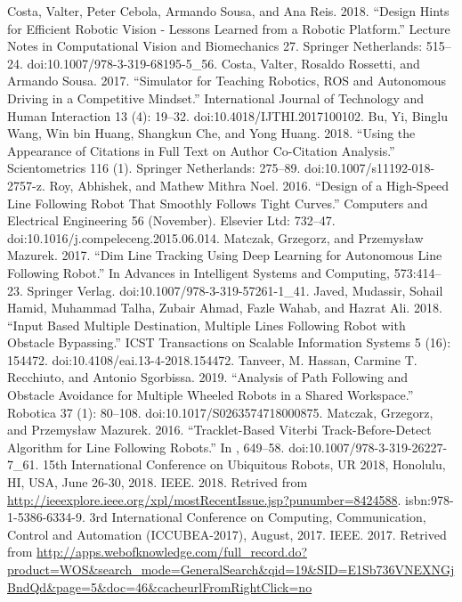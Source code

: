 \documentclass[conference]{IEEEtran}
\begin{document}
\begin{thebibliography}{00}
 Costa, Valter, Peter Cebola, Armando Sousa, and Ana Reis. 2018. “Design Hints for Efficient Robotic Vision - Lessons Learned from a Robotic Platform.” Lecture Notes in Computational Vision and Biomechanics 27. Springer Netherlands: 515–24. doi:10.1007/978-3-319-68195-5\_56.
 Costa, Valter, Rosaldo Rossetti, and Armando Sousa. 2017. “Simulator for Teaching Robotics, ROS and Autonomous Driving in a Competitive Mindset.” International Journal of Technology and Human Interaction 13 (4): 19–32. doi:10.4018/IJTHI.2017100102.
 Bu, Yi, Binglu Wang, Win bin Huang, Shangkun Che, and Yong Huang. 2018. “Using the Appearance of Citations in Full Text on Author Co-Citation Analysis.” Scientometrics 116 (1). Springer Netherlands: 275–89. doi:10.1007/s11192-018-2757-z.
 Roy, Abhishek, and Mathew Mithra Noel. 2016. “Design of a High-Speed Line Following Robot That Smoothly Follows Tight Curves.” Computers and Electrical Engineering 56 (November). Elsevier Ltd: 732–47. doi:10.1016/j.compeleceng.2015.06.014.
 Matczak, Grzegorz, and Przemysław Mazurek. 2017. “Dim Line Tracking Using Deep Learning for Autonomous Line Following Robot.” In Advances in Intelligent Systems and Computing, 573:414–23. Springer Verlag. doi:10.1007/978-3-319-57261-1\_41.
 Javed, Mudassir, Sohail Hamid, Muhammad Talha, Zubair Ahmad, Fazle Wahab, and Hazrat Ali. 2018. “Input Based Multiple Destination, Multiple Lines Following Robot with Obstacle Bypassing.” ICST Transactions on Scalable Information Systems 5 (16): 154472. doi:10.4108/eai.13-4-2018.154472.
 Tanveer, M. Hassan, Carmine T. Recchiuto, and Antonio Sgorbissa. 2019. “Analysis of Path Following and Obstacle Avoidance for Multiple Wheeled Robots in a Shared Workspace.” Robotica 37 (1): 80–108. doi:10.1017/S0263574718000875.
 Matczak, Grzegorz, and Przemysław Mazurek. 2016. “Tracklet-Based Viterbi Track-Before-Detect Algorithm for Line Following Robots.” In , 649–58. doi:10.1007/978-3-319-26227-7\_61.
 15th International Conference on Ubiquitous Robots, {UR} 2018, Honolulu, HI, USA, June 26-30, 2018. IEEE. 2018. Retrived from \url{http://ieeexplore.ieee.org/xpl/mostRecentIssue.jsp?punumber=8424588}. isbn:978-1-5386-6334-9.
 3rd International Conference on Computing, Communication, Control and Automation (ICCUBEA-2017), August, 2017. IEEE. 2017. Retrived from \url{http://apps.webofknowledge.com/full_record.do?product=WOS&search_mode=GeneralSearch&qid=19&SID=E1Sb736VNEXNGjBndQd&page=5&doc=46&cacheurlFromRightClick=no}
\end{thebibliography}
\end{document}
